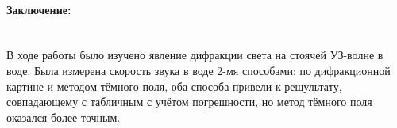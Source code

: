 \documentclass[a4paper, 12pt]{article}
\newcommand{\parag}[1]{\paragraph*{#1:}}
\begin{document}
\parag {Заключение} ~\\
В ходе работы было изучено явление дифракции света на стоячей УЗ-волне
в воде. Была измерена скорость звука в воде 2-мя способами: по дифракционной
картине и методом тёмного поля, оба способа привели к рещультату, совпадающему
с табличным с учётом погрешности, но метод тёмного поля оказался более точным.
\end{document}
